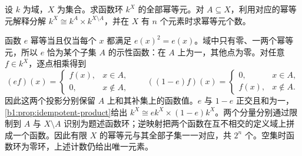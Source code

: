 \begin{exercise}\label{b1:ex:10-function-idempotents}
	设 \(k\) 为域，\(X\) 为集合。求函数环 \(k^X\) 的全部幂等元。对 \(A\subseteq X\)，利用对应的幂等元解释分解 \(k^X\cong k^A\times k^{X\setminus A}\)，并在 \(X\) 有 \(n\) 个元素时求幂等元个数。
\end{exercise}
\begin{solution}
	函数 \(e\) 幂等当且仅当每个 \(x\) 都满足 \(e(x)^2=e(x)\)。域中只有零、一两个幂等元，所以 \(e\) 恰为某个子集 \(A\) 的示性函数：在 \(A\) 上为一，其他点为零。对任意 \(f\in k^X\)，逐点相乘得到
	\[
		(ef)(x)=\begin{cases}f(x),&x\in A,\\0,&x\notin A,\end{cases}
		\qquad
		((1-e)f)(x)=\begin{cases}0,&x\in A,\\f(x),&x\notin A.\end{cases}
	\]
	因此这两个投影分别保留 \(A\) 上和其补集上的函数值。\(e\) 与 \(1-e\) 正交且和为一，\cref{b1:prop:idempotent-product}给出 \(k^X\cong e k^X\times(1-e)k^X\)。两个分量分别通过限制到 \(A\) 与 \(X\setminus A\) 识别为题述函数环；逆映射把两个函数在互不相交的定义域上拼成一个函数。因此有限 \(X\) 的幂等元与其全部子集一一对应，共 \(2^n\) 个。空集时函数环为零环，上述计数仍给出唯一元素。
\end{solution}

